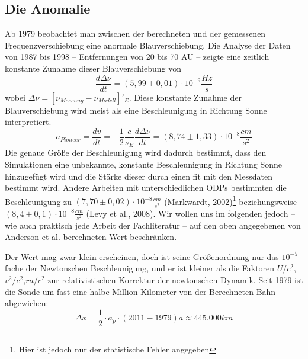 
\subsection{Die Anomalie}
Ab 1979 beobachtet man zwischen der berechneten und der gemessenen Frequenzverschiebung eine anormale Blauverschiebung.
Die Analyse der Daten von 1987 bis 1998 – Entfernungen von 20 bis 70 AU – zeigte eine zeitlich konstante Zunahme dieser
Blauverschiebung von
\begin{equation}
  \frac{d\Delta\nu}{dt}=(5,99\pm0,01)\cdot10^{-9}\frac{Hz}{s}
\end{equation}
wobei $\Delta\nu=[\nu_{Messung}-\nu_{Modell}]'_E$. Diese konstante Zunahme der Blauverschiebung wird meist als eine
Beschleunigung in Richtung Sonne interpretiert.
\begin{equation}
  a_{Pioneer}=\frac{dv}{dt}=-\frac{1}{2}\frac{c}{\nu_E}\frac{d\Delta\nu}{dt} = (8,74\pm1,33)\cdot10^{-8}\frac{cm}{s^2}
\end{equation}
Die genaue Größe der Beschleunigung wird dadurch bestimmt, dass den Simulationen eine unbekannte, konstante Beschleunigung in Richtung Sonne hinzugefügt wird und die Stärke dieser durch einen fit
mit den Messdaten bestimmt wird.	%
Andere Arbeiten mit unterschiedlichen ODPs bestimmten die Beschleunigung zu $(7,70
\pm0,02)\cdot10^{-8}\frac{cm}{s^2}$ (Markwardt,
2002)\footnote{Hier ist jedoch nur der statistische Fehler angegeben}\cite{Markwardt2002} beziehungsweise
$(8,4\pm0,1)\cdot10^{-8}\frac{cm}{s^2}$ (Levy et al., 2008)\cite{Levy2008}.
Wir wollen uns im folgenden jedoch – wie auch praktisch jede Arbeit der Fachliteratur – auf den oben angegebenen von
Anderson et al. berechneten Wert beschränken.

Der Wert mag zwar klein erscheinen, doch ist seine Größenordnung nur das $10^{-5}$ fache der Newtonschen Beschleunigung,
und er ist kleiner als die Faktoren $U/c^2$,$v^2/c^2$,$r a/c^2$ zur relativistischen Korrektur der newtonschen Dynamik.
Seit 1979 ist die Sonde um fast eine halbe Million Kilometer von der Berechneten Bahn abgewichen:
\begin{equation}
  \Delta x= \frac12 \cdot a_p \cdot (2011-1979) a\approx 445.000 km
\end{equation}

